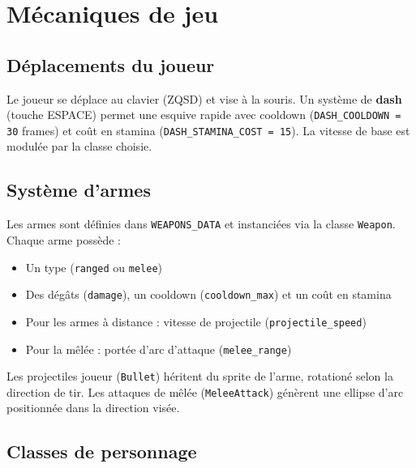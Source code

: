 \documentclass[12pt, a4paper]{report}
\begin{document}
\section{M\'{e}caniques de jeu}

\subsection{D\'{e}placements du joueur}

Le joueur se d\'{e}place au clavier (ZQSD) et vise \`{a} la souris. Un syst\`{e}me de \textbf{dash} (touche ESPACE) permet une esquive rapide avec cooldown (\texttt{DASH\_COOLDOWN = 30} frames) et co\^{u}t en stamina (\texttt{DASH\_STAMINA\_COST = 15}). La vitesse de base est modul\'{e}e par la classe choisie.

\subsection{Syst\`{e}me d'armes}

Les armes sont d\'{e}finies dans \texttt{WEAPONS\_DATA} et instanci\'{e}es via la classe \texttt{Weapon}. Chaque arme poss\`{e}de :
\begin{itemize}[noitemsep]
  \item Un type (\texttt{ranged} ou \texttt{melee})
  \item Des d\'{e}g\^{a}ts (\texttt{damage}), un cooldown (\texttt{cooldown\_max}) et un co\^{u}t en stamina
  \item Pour les armes \`{a} distance : vitesse de projectile (\texttt{projectile\_speed})
  \item Pour la m\^{e}l\'{e}e : port\'{e}e d'arc d'attaque (\texttt{melee\_range})
\end{itemize}

Les projectiles joueur (\texttt{Bullet}) h\'{e}ritent du sprite de l'arme, rotation\'{e} selon la direction de tir. Les attaques de m\^{e}l\'{e}e (\texttt{MeleeAttack}) g\'{e}n\`{e}rent une ellipse d'arc positionn\'{e}e dans la direction vis\'{e}e.

\subsection{Classes de personnage}
\end{document}
